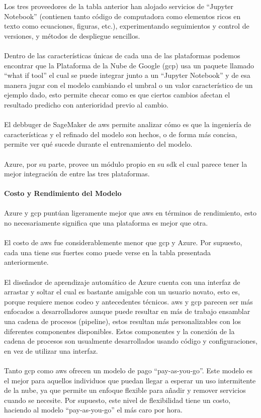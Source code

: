 \documentclass[12pt, a4paper, titlepage]{report}
\begin{document}
		\newpage
		Los tres proveedores de la tabla anterior han alojado servicios de “Jupyter Notebook” (contienen tanto código de computadora como elementos ricos en texto como ecuaciones, figuras, etc.), experimentando seguimientos y control de versiones, y métodos de despliegue sencillos.\\
		\\
		Dentro de las características únicas de cada una de las plataformas podemos encontrar que la Plataforma de la Nube de Google (\acrshort{gcp}) usa un paquete llamado “what if tool” el cual se puede integrar junto a un “Jupyter Notebook” y de esa manera jugar con el modelo cambiando el umbral o un valor característico de un ejemplo dado, esto permite checar como es que ciertos cambios afectan el resultado predicho con anterioridad previo al cambio.\\
		\\
		El debbuger de SageMaker de \acrshort{aws} permite analizar cómo es que la ingeniería de características y el refinado del modelo son hechos, o de forma más concisa, permite ver qué sucede durante el entrenamiento del modelo.\\
		\\
		Azure, por su parte, provee un módulo propio en su \acrshort{sdk} el cual parece tener la mejor integración de entre las tres plataformas.\\
		\\
		\textbf{Costo y Rendimiento del Modelo}\\
		\\
		Azure y \acrshort{gcp} puntúan ligeramente mejor que \acrshort{aws} en términos de rendimiento, esto no necesariamente significa que una plataforma es mejor que otra.\\
		\\
		El costo de \acrshort{aws} fue considerablemente menor que \acrshort{gcp} y Azure. Por supuesto, cada una tiene sus fuertes como puede verse en la tabla presentada anteriormente.\\
		\\
		El diseñador de aprendizaje automático de Azure cuenta con una interfaz de arrastar y soltar el cual es bastante amigable con un usuario novato, esto es, porque requiere menos codeo y antecedentes técnicos. \acrshort{aws} y \acrshort{gcp} parecen ser más enfocados a desarrolladores aunque puede resultar en más de trabajo ensamblar una cadena de procesos (pipeline), estos resultan más personalizables con los diferentes componentes disponibles. Estos componentes y la conexión de la cadena de procesos son usualmente desarrollados usando código y configuraciones, en vez de utilizar una interfaz.\\
		\\
		Tanto \acrshort{gcp} como \acrshort{aws} ofrecen un modelo de pago “pay-as-you-go”. Este modelo es el mejor para aquellos individuos que puedan llegar a esperar un uso intermitente de la nube, ya que permite un enfoque flexible para añadir y remover servicios cuando se necesite. Por supuesto, este nivel de flexibilidad tiene un costo, haciendo al modelo “pay-as-you-go” el más caro por hora.
		
\end{document}
